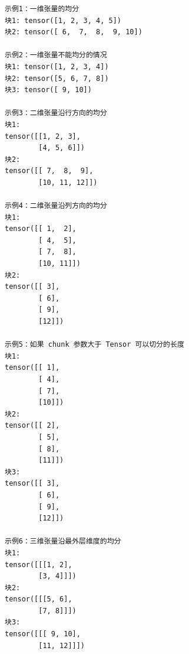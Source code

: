 \begin{lstlisting}[style=demostyle,numbers=none]
示例1：一维张量的均分
块1: tensor([1, 2, 3, 4, 5])
块2: tensor([ 6,  7,  8,  9, 10])

示例2：一维张量不能均分的情况
块1: tensor([1, 2, 3, 4])
块2: tensor([5, 6, 7, 8])
块3: tensor([ 9, 10])

示例3：二维张量沿行方向的均分
块1:
tensor([[1, 2, 3],
        [4, 5, 6]])
块2:
tensor([[ 7,  8,  9],
        [10, 11, 12]])

示例4：二维张量沿列方向的均分
块1:
tensor([[ 1,  2],
        [ 4,  5],
        [ 7,  8],
        [10, 11]])
块2:
tensor([[ 3],
        [ 6],
        [ 9],
        [12]])

示例5：如果 chunk 参数大于 Tensor 可以切分的长度
块1:
tensor([[ 1],
        [ 4],
        [ 7],
        [10]])
块2:
tensor([[ 2],
        [ 5],
        [ 8],
        [11]])
块3:
tensor([[ 3],
        [ 6],
        [ 9],
        [12]])

示例6：三维张量沿最外层维度的均分
块1:
tensor([[[1, 2],
        [3, 4]]])
块2:
tensor([[[5, 6],
        [7, 8]]])
块3:
tensor([[[ 9, 10],
        [11, 12]]])
\end{lstlisting}

